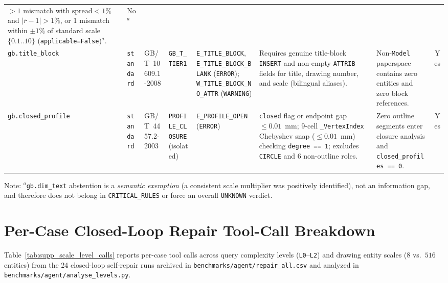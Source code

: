 \documentclass[nocopyright,nolists,upint,varvw,hyphenate]{asmejour}
\begin{document}
\begin{table}[t]
\begin{minipage}{\textwidth}
\begin{tabularx}{\textwidth}{L{2.0cm} l L{1.5cm} L{1.6cm} L{2.45cm} Y L{2.3cm} c}
$>1$ mismatch with $\text{spread} < 1\%$ and $|\bar{r}-1|>1\%$, or 1 mismatch within $\pm 1\%$ of standard scale $\{0.1..10\}$ (\texttt{applicable=False})$^{a}$. &
No$^{a}$ \\
\addlinespace[2pt]
\texttt{gb.title\_block} & \texttt{standard} & GB/T~10609.1-2008 & \texttt{GB\_T\_TIER1} &
\texttt{E\_TITLE\_BLOCK}, \texttt{E\_TITLE\_BLOCK\_BLANK} (\texttt{ERROR}); \texttt{W\_TITLE\_BLOCK\_NO\_ATTR} (\texttt{WARNING}) &
Requires genuine title-block \texttt{INSERT} and non-empty \texttt{ATTRIB} fields for title, drawing number, and scale (bilingual aliases). &
Non-\texttt{Model} paperspace contains zero entities and zero block references. &
Yes \\
\addlinespace[2pt]
\texttt{gb.closed\_profile} & \texttt{standard} & GB/T~4457.2-2003 & \texttt{PROFILE\_CLOSURE} (isolated) &
\texttt{E\_PROFILE\_OPEN} (\texttt{ERROR}) &
\texttt{closed} flag or endpoint gap $\le 0.01$~mm; 9-cell \texttt{\_VertexIndex} Chebyshev snap ($\le 0.01$~mm) checking \texttt{degree == 1}; excludes \texttt{CIRCLE} and 6 non-outline roles. &
Zero outline segments enter closure analysis and \texttt{closed\_profiles == 0}. &
Yes \\
\bottomrule
\end{tabularx}
\par\smallskip\footnotesize
Note: $^{a}$\texttt{gb.dim\_text} abstention is a \emph{semantic exemption} (a consistent scale multiplier was positively identified), not an information gap, and therefore does not belong in \texttt{CRITICAL\_RULES} or force an overall \texttt{UNKNOWN} verdict.
\end{minipage}
\end{table}

\section{Per-Case Closed-Loop Repair Tool-Call Breakdown}\label{sec:supp_repair}

Table~\ref{tab:supp_scale_level_calls} reports per-case tool calls across query complexity levels (\texttt{L0}--\texttt{L2}) and drawing entity scales ($8$ vs.\ $516$ entities) from the 24 closed-loop self-repair runs archived in \texttt{benchmarks/agent/repair\_all.csv} and analyzed in \texttt{benchmarks/agent/analyse\_levels.py}.
\end{document}
